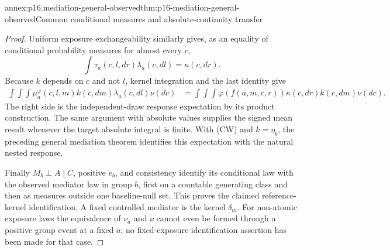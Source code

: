 \begin{annexitem}{annex:p16.mediation-general-observed}{thm:p16-mediation-general-observed}{Common conditional measures and absolute-continuity transfer}
\begin{proof}
Uniform exposure exchangeability similarly gives, as an equality of
conditional probability measures for almost every \(c\),
\[
 \int\tau_a(c,l,dr)\lambda_a(c,dl)=\kappa(c,dr).
\]
Because \(k\) depends on \(c\) and not \(l\), kernel integration and
the last identity give
\[
\begin{aligned}
 \int\!\int\!\int\mu_a^\varphi(c,l,m)k(c,dm)\lambda_a(c,dl)\nu(dc)
 &=\int\!\int\!\int\varphi(f(a,m,c,r))\kappa(c,dr)k(c,dm)\nu(dc).
\end{aligned}
\]
The right side is the independent-draw response expectation by its
product construction. The same argument with absolute values supplies
the signed mean result whenever the target absolute integral is finite.
With (CW) and \(k=\eta_b\), the preceding general mediation theorem
identifies this expectation with the natural nested response.

Finally \(M_b\perp A\mid C\), positive \(e_b\), and consistency
identify its conditional law with the observed mediator law in group
\(b\), first on a countable generating class and then as measures outside
one baseline-null set. This proves the claimed reference-kernel
identification. A fixed controlled mediator is the kernel \(\delta_m\).
For non-atomic exposure laws the equivalence of \(\nu_a\) and \(\nu\)
cannot even be formed through a positive group event at a fixed \(a\);
no fixed-exposure identification assertion has been made for that case.
\end{proof}
\end{annexitem}

